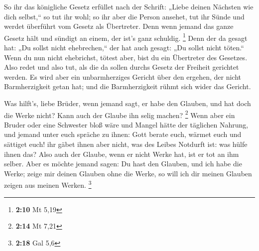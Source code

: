  So ihr das königliche Gesetz erfüllet nach der Schrift:
„Liebe deinen Nächsten wie dich selbst,`` so tut ihr wohl;
 so ihr aber die Person ansehet, tut ihr Sünde und werdet
überführt vom Gesetz als Übertreter.  Denn wenn jemand
das ganze Gesetz hält und sündigt an einem, der ist's ganz schuldig.
\footnote{\textbf{2:10} Mt 5,19}  Denn der da gesagt hat:
„Du sollst nicht ehebrechen,`` der hat auch gesagt: „Du sollst nicht
töten.`` Wenn du nun nicht ehebrichst, tötest aber, bist du ein
Übertreter des Gesetzes.  Also redet und also tut, als
die da sollen durchs Gesetz der Freiheit gerichtet werden.
 Es wird aber ein unbarmherziges Gericht über den
ergehen, der nicht Barmherzigkeit getan hat; und die Barmherzigkeit
rühmt sich wider das Gericht.

 Was hilft's, liebe Brüder, wenn jemand sagt, er habe den
Glauben, und hat doch die Werke nicht? Kann auch der Glaube ihn selig
machen? \footnote{\textbf{2:14} Mt 7,21}  Wenn aber ein
Bruder oder eine Schwester bloß wäre und Mangel hätte der täglichen
Nahrung,  und jemand unter euch spräche zu ihnen: Gott
berate euch, wärmet euch und sättiget euch! ihr gäbet ihnen aber nicht,
was des Leibes Notdurft ist: was hülfe ihnen das?  Also
auch der Glaube, wenn er nicht Werke hat, ist er tot an ihm selber.
 Aber es möchte jemand sagen: Du hast den Glauben, und
ich habe die Werke; zeige mir deinen Glauben ohne die Werke, so will ich
dir meinen Glauben zeigen aus meinen Werken. \footnote{\textbf{2:18} Gal
  5,6}

